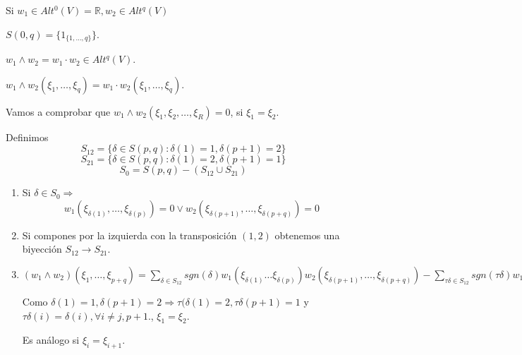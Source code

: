 \begin{nota}

Si $w_1\in Alt^0(V)=\mathbb{R}, w_2\in Alt^q(V)$

\begin{itemize*}
\item $S(0,q)=\{1_{\{1,\dots, q\}}\}$.

\item $w_1\wedge w_2 = w_1\cdot w_2\in Alt^q(V)$.

\item $w_1\wedge w_2(\xi_1,\dots , \xi_q)=w_1\cdot w_2(\xi_1,\dots , \xi_q)$.
\end{itemize*}
\end{nota}



Vamos a comprobar que $w_1\wedge w_2(\xi_1,\xi_2,\dots, \xi_R)=0$, si $\xi_1=\xi_2$. 

Definimos 
$$S_{12}=\{\delta\in S(p,q):\delta(1)=1, \delta(p+1)=2\} $$
$$S_{21}=\{\delta\in S(p,q):\delta(1)=2, \delta(p+1)=1\}$$
$$S_0  =S(p,q)-(S_{12}\cup S_{21}) $$ 

\begin{enumerate}
\item Si $\delta \in S_0 \Rightarrow$
$$w_1(\xi_{\delta(1)},\dots, \xi_{\delta(p)})=0  \vee w_2(\xi_{\delta(p+1)},\dots, \xi_{\delta(p+q)})=0$$ 

\item Si compones por la izquierda con la transposición $(1,2)$ obtenemos una biyección $S_{12}\rightarrow S_{21}$. 

\item $(w_1\wedge w_2)(\xi_1,\dots, \xi_{p+q})=\sum_{\delta\in S_{12}}sgn(\delta)w_1(\xi_{\delta(1)}\dots \xi_{\delta(p)})w_2(\xi_{\delta(p+1)},\dots , \xi_{\delta(p+q)})-\sum_{\tau\delta\in S_{12}}sgn(\tau\delta)w_1(\xi_{\tau\delta(1)}\dots \xi_{\tau\delta(p)})w_2(\xi_{\tau\delta(p+1)},\dots , \xi_{\tau\delta(p+q)})=0$

Como $\delta(1)=1, \delta(p+1)=2 \Rightarrow \tau(\delta(1)=2, \tau\delta(p+1)=1$ y $\tau\delta(i)=\delta(i), \forall i\neq j, p+1.$, $\xi_1=\xi_2$.

Es análogo si $\xi_i=\xi_{i+1}$. 
\end{enumerate}